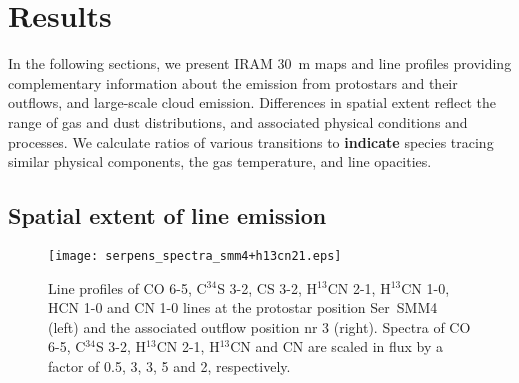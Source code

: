\documentclass{aa}
\begin{document}
\section{Results} 
\label{section:results}

In the following sections, we present IRAM 30~m maps and line profiles 
providing complementary information about the emission from 
protostars and their outflows, and large-scale cloud emission.
Differences in spatial extent reflect the range of gas and dust 
distributions, and associated physical conditions and processes. 
We calculate ratios of various transitions to 
\textbf{indicate} species tracing similar physical components, the gas temperature,
and line opacities. 

\subsection{Spatial extent of line emission}
\label{subsection:emission}

\begin{figure*} 
\texttt{[image: serpens\_spectra\_smm4+h13cn21.eps]} 
\caption{ \label{SMM4spectra} Line profiles of CO 6-5, C$^{34}$S 3-2, CS 3-2, H$^{13}$CN 2-1, H$^{13}$CN 1-0, HCN 1-0 and CN 1-0 lines at the protostar position Ser~SMM4 (left) and the associated outflow position nr 3 (right). Spectra of CO 6-5, C$^{34}$S 3-2, H$^{13}$CN 2-1, H$^{13}$CN and CN are scaled in flux by a factor of 0.5, 3, 3, 5 and 2, respectively.} 
\end{figure*}
\end{document}
